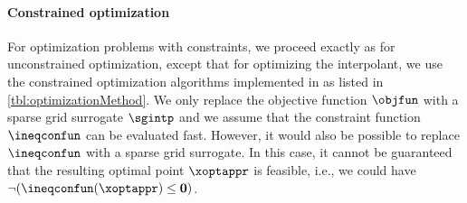 \paragraph{Constrained optimization}

For optimization problems with constraints,
we proceed exactly as for unconstrained optimization,
except that for optimizing the interpolant, we use the
constrained optimization algorithms implemented in \sgpp
as listed in \cref{tbl:optimizationMethod}.
We only replace the objective function $\objfun$ with a sparse grid
surrogate $\sgintp$ and we assume that the constraint function
$\ineqconfun$ can be evaluated fast.
However, it would also be possible to replace $\ineqconfun$
with a sparse grid surrogate.
In this case, it cannot be guaranteed that the resulting optimal point
$\xoptappr$ is feasible, i.e., we could have
$\lnot(\ineqconfun(\xoptappr) \le \*0)$.
